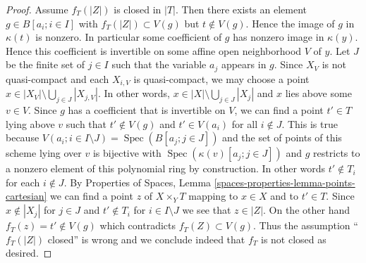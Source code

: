 \documentclass[10pt,a4paper]{amsart}
\theoremstyle{plain}
\theoremstyle{definition}
\theoremstyle{remark}
\numberwithin{equation}{subsection}
\def\Spec{\mathop{\mathrm{Spec}}}
\begin{document}
\begin{proof}
\medskip\noindent
Assume $f_T(|Z|)$ is closed in $|T|$. Then there exists an element
$g \in B[a_i; i \in I]$ with $f_T(|Z|) \subset V(g)$ but $t \not \in V(g)$.
Hence the image of $g$ in $\kappa(t)$ is nonzero. In particular some
coefficient of $g$ has nonzero image in $\kappa(y)$. Hence this coefficient is
invertible on some affine open neighborhood $V$ of $y$. Let $J$ be the finite
set of $j \in I$ such that the variable $a_j$ appears in $g$.
Since $X_V$ is not quasi-compact and each $X_{i, V}$ is quasi-compact,
we may choose a point $x \in |X_V| \setminus \bigcup_{j \in J} |X_{j, V}|$.
In other words, $x \in |X| \setminus \bigcup_{j \in J} |X_j|$ and $x$ lies
above some $v \in V$. Since $g$ has a coefficient that is invertible on $V$,
we can find a point $t' \in T$ lying above $v$ such that $t' \not \in V(g)$ and
$t' \in V(a_i)$ for all $i \notin J$. This is true because
$V(a_i; i \in I \setminus J) = \Spec(B[a_j; j\in J])$
and the set of points of this scheme lying over $v$ is bijective
with $\Spec(\kappa(v)[a_j; j \in J])$ and $g$ restricts to
a nonzero element of this polynomial ring by construction.
In other words $t' \not \in T_i$ for each $i \not \in J$. By
Properties of Spaces, Lemma \ref{spaces-properties-lemma-points-cartesian}
we can find a point $z$ of $X \times_Y T$ mapping to $x \in X$ and to
$t' \in T$. Since $x \not \in |X_j|$ for $j \in J$ and $t' \not \in T_i$
for $i \in I \setminus J$ we see that $z \in |Z|$. On the other hand
$f_T(z) = t' \not \in V(g)$ which contradicts $f_T(Z) \subset V(g)$.
Thus the assumption ``$f_T(|Z|)$ closed'' is wrong and we conclude indeed
that $f_T$ is not closed as desired.
\end{proof}
\end{document}
